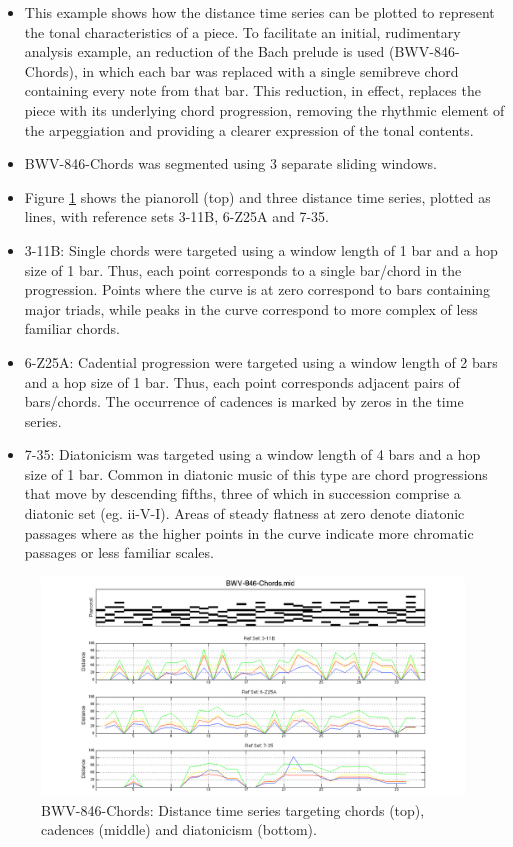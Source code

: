 \documentclass{article}
\begin{document}
\begin{itemize}
\item This example shows how the distance time series can be plotted to
  represent the tonal characteristics of a piece. To facilitate an
  initial, rudimentary analysis example, an reduction of the Bach
  prelude is used (BWV-846-Chords), in which each bar was replaced
  with a single semibreve chord containing every note from that
  bar. This reduction, in effect, replaces the piece with its
  underlying chord progression, removing the rhythmic element of the
  arpeggiation and providing a clearer expression of the tonal
  contents.
\item BWV-846-Chords was segmented using 3 separate sliding windows.
\item Figure \ref{fig:refsets} shows the pianoroll (top) and three
  distance time series, plotted as lines, with reference sets 3-11B,
  6-Z25A and 7-35.
\item 3-11B: Single chords were targeted using a window length of 1 bar
  and a hop size of 1 bar. Thus, each point corresponds to a single
  bar/chord in the progression. Points where the curve is at zero
  correspond to bars containing major triads, while peaks in the curve
  correspond to more complex of less familiar chords.
\item 6-Z25A: Cadential progression were targeted using a window length of
  2 bars and a hop size of 1 bar. Thus, each point corresponds
  adjacent pairs of bars/chords. The occurrence of cadences is marked
  by zeros in the time series.
\item 7-35: Diatonicism was targeted using a window length of 4 bars and a
  hop size of 1 bar. Common in diatonic music of this type are chord
  progressions that move by descending fifths, three of which in
  succession comprise a diatonic set (eg. ii-V-I). Areas of steady
  flatness at zero denote diatonic passages where as the higher points
  in the curve indicate more chromatic passages or less familiar
  scales.
\end{itemize}
\begin{figure}[htb]
\centering
\includegraphics[width=.8\linewidth]{./plots/refsets.png}
\caption{\label{fig:refsets}BWV-846-Chords: Distance time series targeting chords (top), cadences (middle) and diatonicism (bottom).}
\end{figure}
\end{document}
